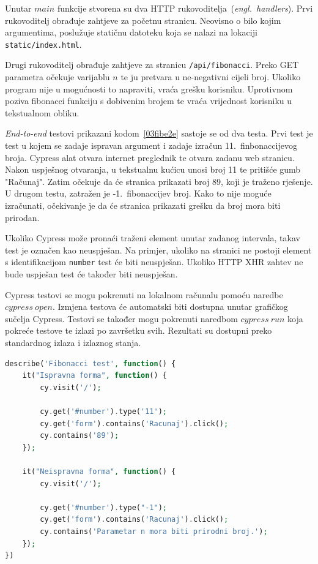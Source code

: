 Unutar $main$ funkcije stvorena su dva HTTP rukovoditelja~(\textit{engl.~handlers}). Prvi
rukovoditelj obrađuje zahtjeve za početnu stranicu. Neovisno o bilo kojim argumentima, poslužuje
statičnu datoteku koja se nalazi na lokaciji \texttt{static/index.html}.

Drugi rukovoditelj obrađuje zahtjeve za stranicu \texttt{/api/fibonacci}. Preko GET parametra
očekuje varijablu $n$ te ju pretvara u ne-negativni cijeli broj. Ukoliko program nije u mogućnosti
to napraviti, vraća grešku korisniku. Uprotivnom poziva fibonacci funkciju s dobivenim brojem te
vraća vrijednost korisniku u tekstualnom obliku.

\textit{End-to-end} testovi prikazani kodom~\ref{03fibe2e} sastoje se od dva testa. Prvi test je
test u kojem se zadaje ispravan argument i zadaje izračun 11.~finbonaccijevog broja. Cypress alat
otvara internet preglednik te otvara zadanu web stranicu. Nakon uspješnog otvaranja, u tekstualnu
kućicu unosi broj 11 te pritišće gumb "Računaj". Zatim očekuje da će stranica prikazati broj 89,
koji je traženo rješenje. U drugom testu, zatražen je -1.~fibonaccijev broj. Kako to nije moguće
izračunati, očekivanje je da će stranica prikazati grešku da broj mora biti prirodan.

Ukoliko Cypress može pronaći traženi element unutar zadanog intervala, takav test je označen kao
neuspješan. Na primjer, ukoliko na stranici ne postoji element s identifikacijom \texttt{number}
test će biti neuspješan.  Ukoliko HTTP XHR zahtev ne bude uspješan test će također biti neuspješan.

Cypress testovi se mogu pokrenuti na lokalnom računalu pomoću naredbe $cypress~open$. Izmjena
testova će automatski biti dostupna unutar grafičkog sučelja Cypress. Testovi se također mogu
pokrenuti naredbom $cypress~run$ koja pokreće testove te izlazi po završetku svih. Rezultati su
dostupni preko standardnog izlaza i izlaznog stanja.

\begin{lstlisting}[language=php,float=h]
describe('Fibonacci test', function() {
    it("Ispravna forma", function() {
        cy.visit('/');

        cy.get('#number').type('11');
        cy.get('form').contains('Racunaj').click();
        cy.contains('89');
    });

    it("Neispravna forma", function() {
        cy.visit('/');

        cy.get('#number').type("-1");
        cy.get('form').contains('Racunaj').click();
        cy.contains('Parametar n mora biti prirodni broj.');
    });
})
\end{lstlisting}


